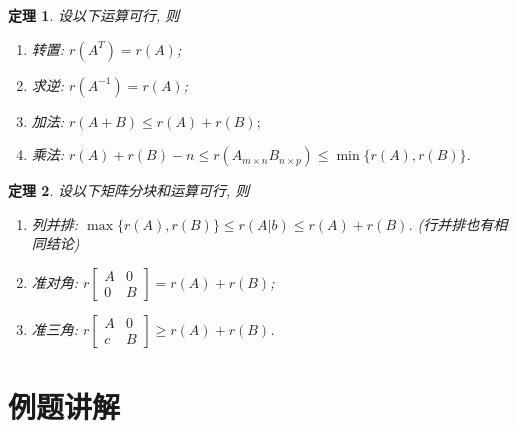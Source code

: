 \documentclass[a4paper]{book}
\newtheorem{thm}{定理}[chapter]
\begin{document}
\begin{thm}
设以下运算可行, 则
\begin{enumerate}
\item 转置: $r(A^T)=r(A)$;
\item 求逆: $r(A^{-1})=r(A)$;
\item 加法: $r(A+B)\leq r(A)+r(B);$
\item 乘法: $r(A)+r(B)-n\leq r(A_{m\times n}B_{n\times p })\leq \min \{r(A),r(B)\}$.

\end{enumerate}

\end{thm}

\begin{thm}
设以下矩阵分块和运算可行, 则
\begin{enumerate}
\item 列并排: $\max\{r(A),r(B)\}\leq r(A|b)\leq  r(A)+r(B)$. (行并排也有相同结论)
\item 准对角: $r\begin{bmatrix} A&0\\0&B\end{bmatrix}=r(A)+r(B)$;
\item 准三角: $r\begin{bmatrix} A&0\\c&B\end{bmatrix}\geq r(A)+r(B)$.
\end{enumerate}
\end{thm}


\section{例题讲解}
\end{document}
